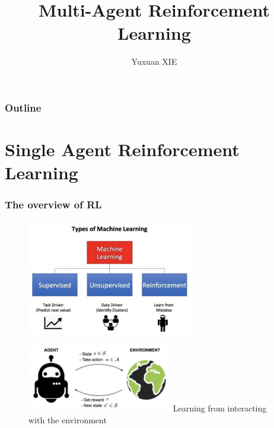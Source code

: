 \documentclass[notheorems, aspectratio=54]{beamer}
\title[Multi-Agent RL]{Multi-Agent Reinforcement Learning}
\author{Yuxuan XIE}
\institute[HIT]{yuxuan.xie@hotmail.com}
\begin{document}
\begin{frame}
  \titlepage
\end{frame}

\begin{frame}
  \frametitle{Outline}

  \tableofcontents
\end{frame}

\section{Single Agent Reinforcement Learning}
\begin{frame}
  \frametitle{The overview of RL}
  \vfill
  \begin{figure}[h]
    \begin{minipage}{0.45\textwidth}
      \includegraphics[width=\textwidth, height=5cm]{relation.png}
    \end{minipage}
    \hspace{0.05\linewidth}
    \begin{minipage}{0.45\textwidth}
      \includegraphics[width=\textwidth, height=3cm]{rl.png}
      Learning from interacting with the environment
    \end{minipage}
  \end{figure}
  \vfill
\end{frame}
\end{document}
